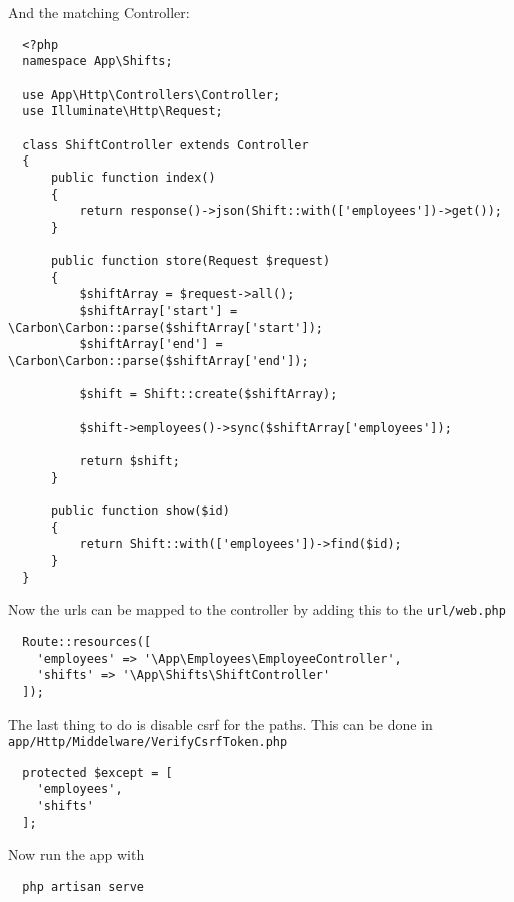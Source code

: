 And the matching Controller:
\begin{verbatim}
  <?php
  namespace App\Shifts;

  use App\Http\Controllers\Controller;
  use Illuminate\Http\Request;

  class ShiftController extends Controller
  {
      public function index()
      {
          return response()->json(Shift::with(['employees'])->get());
      }

      public function store(Request $request)
      {
          $shiftArray = $request->all();
          $shiftArray['start'] = \Carbon\Carbon::parse($shiftArray['start']);
          $shiftArray['end'] = \Carbon\Carbon::parse($shiftArray['end']);

          $shift = Shift::create($shiftArray);

          $shift->employees()->sync($shiftArray['employees']);

          return $shift;
      }

      public function show($id)
      {
          return Shift::with(['employees'])->find($id);
      }
  }
\end{verbatim}

Now the urls can be mapped to the controller by adding this to the \texttt{url/web.php}
\begin{verbatim}
  Route::resources([
    'employees' => '\App\Employees\EmployeeController',
    'shifts' => '\App\Shifts\ShiftController'
  ]);
\end{verbatim}

The last thing to do is disable csrf for the paths. This can be done in \texttt{app/Http/Middelware/VerifyCsrfToken.php}
\begin{verbatim}
  protected $except = [
    'employees',
    'shifts'
  ];
\end{verbatim}

Now run the app with
\begin{verbatim}
  php artisan serve
\end{verbatim}
